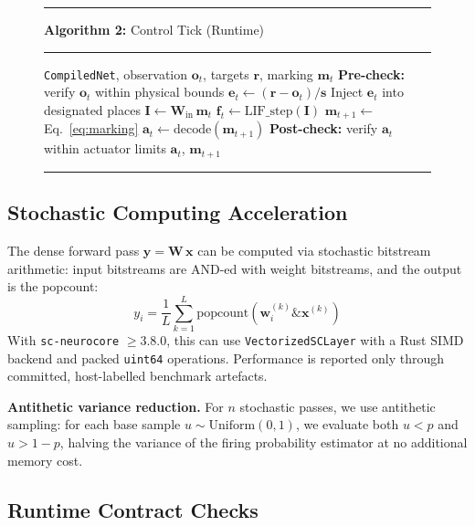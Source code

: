 \documentclass[twocolumn,preprintnumbers,amsmath,amssymb,prl,floatfix]{revtex4-2}
\begin{document}
\begin{figure}[t]
\hrule\smallskip
\textbf{Algorithm 2:} Control Tick (Runtime)
\label{alg:tick}
\smallskip\hrule\smallskip
\begin{algorithmic}[1]
\Require \texttt{CompiledNet}, observation $\mathbf{o}_t$,
         targets $\mathbf{r}$, marking $\mathbf{m}_t$
\State \textbf{Pre-check:} verify $\mathbf{o}_t$ within
       physical bounds
\State $\mathbf{e}_t \gets (\mathbf{r} - \mathbf{o}_t) /
       \mathbf{s}$ 
\State Inject $\mathbf{e}_t$ into designated places
\State $\mathbf{I} \gets \mathbf{W}_\mathrm{in}\,\mathbf{m}_t$
\State $\mathbf{f}_t \gets \mathrm{LIF\_step}(\mathbf{I})$
\State $\mathbf{m}_{t+1} \gets$ Eq.~\ref{eq:marking}
\State $\mathbf{a}_t \gets \mathrm{decode}(\mathbf{m}_{t+1})$
\State \textbf{Post-check:} verify $\mathbf{a}_t$ within
       actuator limits
\State \Return $\mathbf{a}_t$, $\mathbf{m}_{t+1}$
\end{algorithmic}
\smallskip\hrule
\end{figure}

\subsection{Stochastic Computing Acceleration}

The dense forward pass $\mathbf{y} = \mathbf{W}\,\mathbf{x}$
can be computed via stochastic bitstream arithmetic: input
bitstreams are AND-ed with weight bitstreams, and the output is
the popcount:
%
\begin{equation}
  y_i = \frac{1}{L} \sum_{k=1}^{L}
  \mathrm{popcount}\!\left(
    \mathbf{w}_i^{(k)} \mathbin{\&} \mathbf{x}^{(k)}
  \right)
\end{equation}
%
With \texttt{sc-neurocore} $\geq 3.8.0$, this can use
\texttt{VectorizedSCLayer} with a Rust SIMD backend and packed
\texttt{uint64} operations. Performance is reported only through committed,
host-labelled benchmark artefacts.

\textbf{Antithetic variance reduction.}\quad
For $n$ stochastic passes, we use antithetic sampling:
for each base sample $u \sim \mathrm{Uniform}(0,1)$,
we evaluate both $u < p$ and $u > 1-p$, halving the
variance of the firing probability estimator at no
additional memory cost.

\subsection{Runtime Contract Checks}
\label{sec:contracts}
\end{document}
